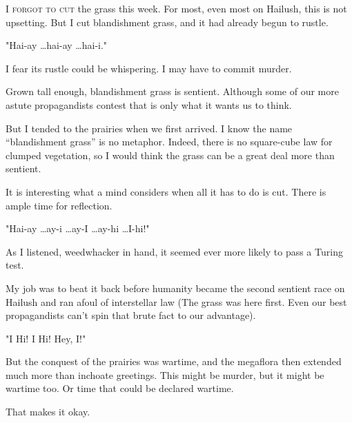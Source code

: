 
\lettrine{I}{ forgot to cut} the grass this week. For most, even most on Hailush, this is not upsetting. But I cut
blandishment grass, and it had already begun to rustle.

"Hai-ay \ldots hai-ay \ldots hai-i."

I fear its rustle could be whispering. I may have to commit murder.

Grown tall enough, blandishment grass is sentient. Although some of our more astute
propagandists contest that is only what it wants us to think.

But I tended to the prairies when we first arrived. I know the name “blandishment grass” is no
metaphor. Indeed, there is no square-cube law for clumped vegetation, so I would think the grass can be a
great deal more than sentient.

It is interesting what a mind considers when all it has to do is cut. There is ample time for
reflection.

"Hai-ay \ldots ay-i \ldots ay-I \ldots ay-hi \ldots I-hi!"

As I listened, weedwhacker in hand, it seemed ever more likely to pass a Turing test.

My job was to beat it back before humanity became the second sentient race on Hailush and ran
afoul of interstellar law (The grass was here first. Even our best propagandists can't spin that brute fact to
our advantage).

"I Hi! I Hi! Hey, I!"

But the conquest of the prairies was wartime, and the megaflora then extended much more than
inchoate greetings. This might be murder, but it might be wartime too. Or time that could be declared
wartime.

That makes it okay.
